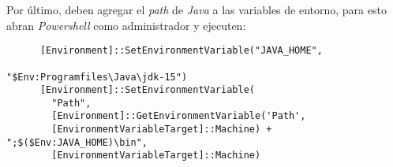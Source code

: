     Por último, deben agregar el \textit{path} de \textit{Java} a las variables de 
    entorno, para esto abran \textit{Powershell} como administrador y ejecuten:

    \begin{verbatim}
      [Environment]::SetEnvironmentVariable("JAVA_HOME", 
                                            "$Env:Programfiles\Java\jdk-15")
      [Environment]::SetEnvironmentVariable(
        "Path", 
        [Environment]::GetEnvironmentVariable('Path', 
        [EnvironmentVariableTarget]::Machine) + ";$($Env:JAVA_HOME)\bin", 
        [EnvironmentVariableTarget]::Machine)
    \end{verbatim}